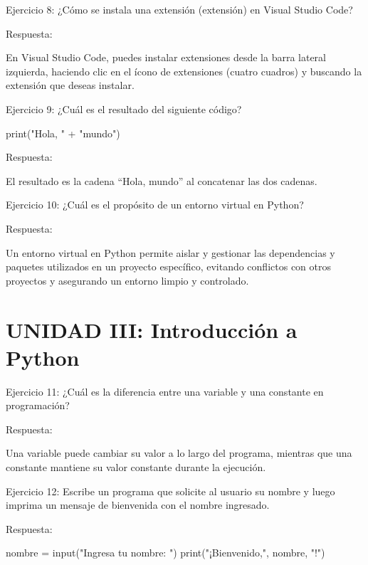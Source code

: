 \documentclass[
  a4paper,
  DIV=11,
  numbers=noendperiod,
  onepage,
  openany]{scrreprt}
\newenvironment{Shaded}{\begin{snugshade}}{\end{snugshade}}
\newcommand{\BuiltInTok}[1]{\textcolor[rgb]{0.00,0.23,0.31}{#1}}
\newcommand{\NormalTok}[1]{\textcolor[rgb]{0.00,0.23,0.31}{#1}}
\newcommand{\OperatorTok}[1]{\textcolor[rgb]{0.37,0.37,0.37}{#1}}
\newcommand{\StringTok}[1]{\textcolor[rgb]{0.13,0.47,0.30}{#1}}
\begin{document}
Ejercicio 8: ¿Cómo se instala una extensión (extensión) en Visual Studio
Code?

Respuesta:

En Visual Studio Code, puedes instalar extensiones desde la barra
lateral izquierda, haciendo clic en el ícono de extensiones (cuatro
cuadros) y buscando la extensión que deseas instalar.

Ejercicio 9: ¿Cuál es el resultado del siguiente código?

\begin{Shaded}
\begin{Highlighting}[]
\BuiltInTok{print}\NormalTok{(}\StringTok{"Hola, "} \OperatorTok{+} \StringTok{"mundo"}\NormalTok{)}
\end{Highlighting}
\end{Shaded}

Respuesta:

El resultado es la cadena ``Hola, mundo'' al concatenar las dos cadenas.

Ejercicio 10: ¿Cuál es el propósito de un entorno virtual en Python?

Respuesta:

Un entorno virtual en Python permite aislar y gestionar las dependencias
y paquetes utilizados en un proyecto específico, evitando conflictos con
otros proyectos y asegurando un entorno limpio y controlado.

\section{UNIDAD III: Introducción a
Python}\label{unidad-iii-introducciuxf3n-a-python}

Ejercicio 11: ¿Cuál es la diferencia entre una variable y una constante
en programación?

Respuesta:

Una variable puede cambiar su valor a lo largo del programa, mientras
que una constante mantiene su valor constante durante la ejecución.

Ejercicio 12: Escribe un programa que solicite al usuario su nombre y
luego imprima un mensaje de bienvenida con el nombre ingresado.

Respuesta:

\begin{Shaded}
\begin{Highlighting}[]
\NormalTok{nombre }\OperatorTok{=} \BuiltInTok{input}\NormalTok{(}\StringTok{"Ingresa tu nombre: "}\NormalTok{)}
\BuiltInTok{print}\NormalTok{(}\StringTok{"¡Bienvenido,"}\NormalTok{, nombre, }\StringTok{"!"}\NormalTok{)}
\end{Highlighting}
\end{Shaded}
\end{document}
